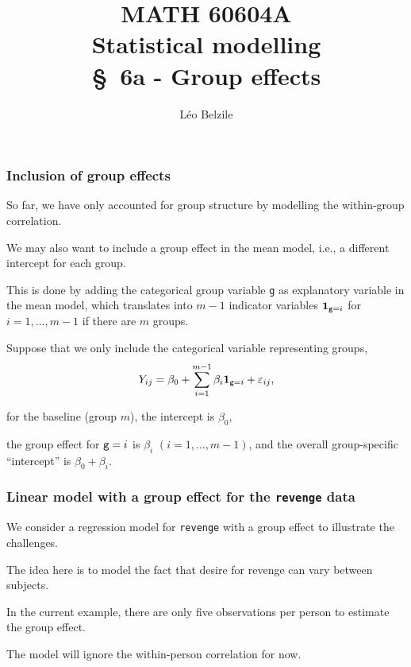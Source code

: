 \documentclass{beamer}
\title[\color{white}{MATH 60604A \S~6a - Group effects}]{\texorpdfstring{MATH 60604A \\Statistical modelling \\ \S~6a - Group effects}{MATH 60604A \\Statistical modelling \\ \S~6a - Group effects}}
\author{Léo Belzile}
\institute{HEC Montréal\\
Department of Decision Sciences}
\date{}
\begin{document}
\frame{\titlepage}
\begin{frame}
 \frametitle{Inclusion of group effects}
 \bi 
 \item So far, we have only accounted for group structure by modelling the within-group correlation.
 \item We may also want to include a \alert{group effect} in the mean model, i.e., a different intercept for each group.
 \item This is done by adding the categorical group variable \texttt{g} as explanatory variable in the mean model, which translates into $m-1$ indicator variables ${\mathbf 1}_{\texttt{g}=i}$ for $i=1, \ldots, m-1$ if there are $m$ groups. 
 \item Suppose that we only include the categorical variable  representing groups,
 \[ Y_{ij}= \beta_0 + \sum_{i=1}^{m-1} \beta_i{\mathbf 1}_{\texttt{g}=i} + \varepsilon_{ij},\]
 \bi \item for the baseline (group $m$), the intercept is $\beta_0$,
 \item the group effect for $\texttt{g}=i$ is $\beta_i$ $(i=1, \ldots, m-1)$, and the overall group-specific ``intercept'' is $\beta_0+ \beta_i$.
 \ei
 \ei
 
 \end{frame}
 
\begin{frame}
\frametitle{Linear model with a group effect for the \texttt{revenge} data}
We consider a regression model for \texttt{revenge} with a group effect to illustrate the challenges.
\bi
\item The idea here is to model the fact that desire for revenge can vary between subjects.
\item In the current example, there are only five observations per person to estimate the group effect.
\item The model will ignore the within-person correlation for now.
\ei
\end{frame}
\end{document}
